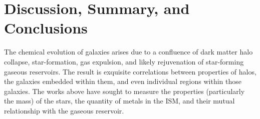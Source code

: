 \chapter{Discussion, Summary, and Conclusions}

The chemical evolution of galaxies arises due to a confluence of dark matter halo collapse, star-formation, gas expulsion, and likely rejuvenation of star-forming gaseous reservoirs. The result is exquisite correlations between properties of halos, the galaxies embedded within them, and even individual regions within those galaxies. The works above have sought to measure the properties (particularly the mass) of the stars, the quantity of metals in the ISM, and their mutual relationship with the gaseous reservoir.